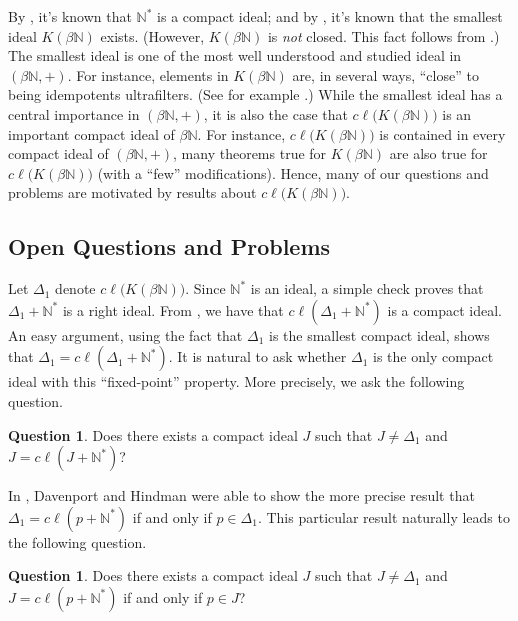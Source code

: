 \documentclass[12pt]{article}
\theoremstyle{plain}
\theoremstyle{definition}
\newtheorem{ques}[thm]{Question}
\newcommand{\bbN}{\mathbb{N}}
\begin{document}
By \cite[Theorem 4.36]{Hindman:1998fk}, it's known that $\bbN^*$ is a
compact ideal; and by \cite[Theorem 4.36]{Hindman:1998fk}, it's known
that the smallest ideal $K(\beta\bbN)$ exists. 
(However, $K(\beta\bbN)$ is \textsl{not} closed. 
This fact follows from \cite[Theorem 4.4]{Hindman:1996uq}.)
The smallest ideal is one of the most well understood and studied
ideal in $(\beta\bbN, +)$.
For instance, elements in $K(\beta\bbN)$ are, in several ways,
``close'' to being idempotents ultrafilters. 
(See for example \cite[Theorems 4.39 and 4.43]{Hindman:1998fk}.)
While the smallest ideal has a central importance in $(\beta\bbN, +)$,
it is also the case that $c\ell\bigl(K(\beta\bbN)\bigr)$ is an
important compact ideal of $\beta\bbN$. 
For instance, $c\ell\bigl(K(\beta\bbN)\bigr)$ is contained in every
compact ideal of $(\beta\bbN, +)$, many theorems true for
$K(\beta\bbN)$ are also true for $c\ell\bigl(K(\beta\bbN)\bigr)$ (with
a ``few'' modifications). 
Hence, many of our questions and problems are motivated by results
about $c\ell\bigl(K(\beta\bbN)\bigr)$.

\subsection{Open Questions and Problems}
Let $\Delta_1$ denote $c\ell\bigl(K(\beta\bbN)\bigr)$.
Since $\bbN^*$ is an ideal, a simple check proves that $\Delta_1 +
\bbN^*$ is a right ideal.
From \cite[Theorem 2.19(a)]{Hindman:1998fk}, we have that
$c\ell(\Delta_1 + \bbN^*)$ is a compact ideal.
An easy argument, using the fact that $\Delta_1$ is the smallest
compact ideal, shows that $\Delta_1 = c\ell(\Delta_1+\bbN^*)$.
It is natural to ask whether $\Delta_1$ is the only compact
ideal with this ``fixed-point'' property.
More precisely, we ask the following question.
\begin{ques}
  Does there exists a compact ideal $J$ such that $J \ne \Delta_1$ and
  $J = c\ell(J+\bbN^*)$?
\end{ques}
In \cite[Lemma 3.3]{Davenport:1987uq}, Davenport and Hindman were able
to show the more precise result that $\Delta_1 = c\ell(p+\bbN^*)$ if
and only if $p \in \Delta_1$.
This particular result naturally leads to the following question.
\begin{ques}
  Does there exists a compact ideal $J$ such that $J \ne \Delta_1$ and
  $J = c\ell(p + \bbN^*)$ if and only if $p \in J$?
\end{ques}
\end{document}

